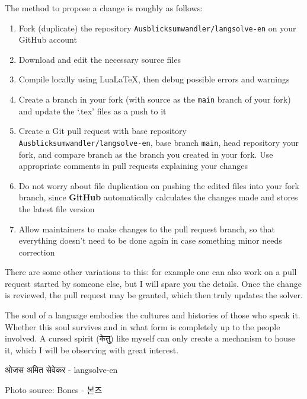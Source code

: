 \documentclass[12pt,twoside]{article}
\newcommand*{\bt}[1]{\textbf{#1}}
\begin{document}
The method to propose a change is roughly as follows:
\begin{enumerate}
    \item Fork (duplicate) the repository \texttt{Ausblicksumwandler/langsolve-en} on your GitHub account
    \item Download and edit the necessary source files
    \item Compile locally using LuaLaTeX, then debug possible errors and warnings
    \item Create a branch in your fork (with source as the \texttt{main} branch of your fork) and update  the  `.tex' files as a push to it
    \item Create  a Git pull request with base repository  \texttt{Ausblicksumwandler/langsolve-en}, base branch  \texttt{main}, head repository  your fork, and compare branch as the branch you created in your fork. Use appropriate comments in pull requests explaining your changes
    \item Do not worry about file duplication on pushing the edited files into your fork branch, since \bt{GitHub} automatically calculates the changes made and stores the latest file version
    \item Allow maintainers to make changes to the pull request branch, so that everything doesn't need to be done again in case something minor needs  correction
\end{enumerate}
There are some other variations to this: for example one can also work on a pull request started by someone else, but I will spare you the details. Once the change is reviewed, the pull request may be granted, which then truly updates the solver.

The soul of a language embodies the cultures and histories of those who speak it. Whether this soul survives and in what form is completely up to the people involved. A cursed spirit (\textsanskrit{केतु}) like myself can only create  a mechanism to house it, which I will be observing  with great interest.

\begin{center}
\Large
\textsanskrit{ओजस अमित सेवेकर} - langsolve-en
\end{center}
Photo source: Bones - \textkorean{본즈}
\end{document}
